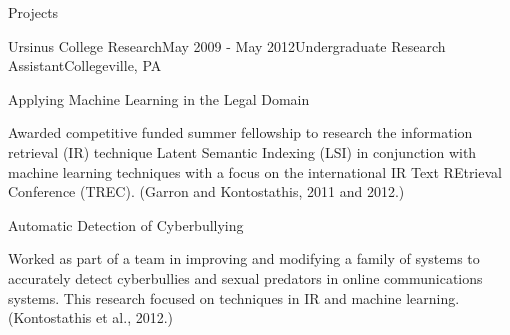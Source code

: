 \documentclass{resume} %
\begin{document}
\begin{rSection}{Projects}
\begin{rSubsection}{Ursinus College Research}{May 2009 - May 2012}{Undergraduate Research Assistant}{Collegeville, PA}
\item
\begin{rWorkProject}{Applying Machine Learning in the Legal Domain}
\item Awarded competitive funded summer fellowship to research the information retrieval (IR) technique Latent Semantic Indexing (LSI) in conjunction with machine learning techniques with a focus on the international IR Text REtrieval Conference (TREC). (Garron and Kontostathis, 2011 and 2012.)
\end{rWorkProject}
\item
\begin{rWorkProject}{Automatic Detection of Cyberbullying}
\item Worked as part of a team in improving and modifying a family of systems to accurately detect cyberbullies and sexual predators in online communications systems. This research focused on techniques in IR and
machine learning. (Kontostathis et al., 2012.)
\end{rWorkProject}
\end{rSubsection}
\end{rSection}


\newpage
\end{document}
